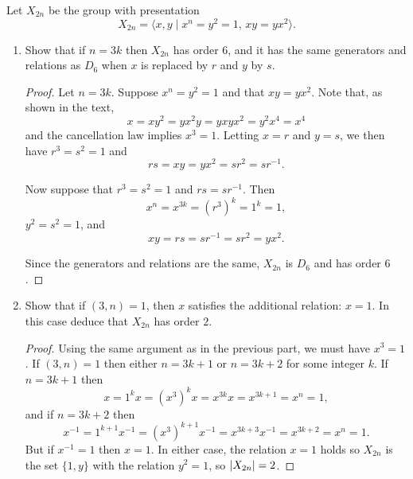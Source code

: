 Let $X_{2n}$ be the group with presentation
\begin{equation*}
  X_{2n} = \langle x, y \mid x^n = y^2 = 1,\,xy = yx^2\rangle.
\end{equation*}
\begin{enumerate}
\item Show that if $n = 3k$ then $X_{2n}$ has order $6$, and it has
  the same generators and relations as $D_6$ when $x$ is replaced by
  $r$ and $y$ by $s$.
  \begin{proof}
    Let $n = 3k$. Suppose $x^n = y^2 = 1$ and that $xy =
    yx^2$. Note that, as shown in the text,
    \begin{equation*}
      x = xy^2 = yx^2y = yxyx^2 = y^2x^4 = x^4
    \end{equation*}
    and the cancellation law implies $x^3 = 1$. Letting $x = r$ and
    $y = s$, we then have $r^3 = s^2 = 1$ and
    \begin{equation*}
      rs = xy = yx^2 = sr^2 = sr^{-1}.
    \end{equation*}

    Now suppose that $r^3 = s^2 = 1$ and $rs = sr^{-1}$. Then
    \begin{equation*}
      x^n = x^{3k} = (r^3)^k = 1^k = 1,
    \end{equation*}
    $y^2 = s^2 = 1$, and
    \begin{equation*}
      xy = rs = sr^{-1} = sr^2 = yx^2.
    \end{equation*}

    Since the generators and relations are the same, $X_{2n}$ is $D_6$
    and has order $6$.
  \end{proof}
\item Show that if $(3,n) = 1$, then $x$ satisfies the additional
  relation: $x = 1$. In this case deduce that $X_{2n}$ has order $2$.
  \begin{proof}
    Using the same argument as in the previous part, we must have
    $x^3 = 1$. If $(3,n) = 1$ then either $n = 3k + 1$ or $n = 3k + 2$
    for some integer $k$. If $n = 3k + 1$ then
    \begin{equation*}
      x = 1^kx = (x^3)^kx = x^{3k}x = x^{3k+1} = x^n = 1,
    \end{equation*}
    and if $n = 3k + 2$ then
    \begin{equation*}
      x^{-1} = 1^{k+1}x^{-1} = (x^3)^{k+1}x^{-1} = x^{3k+3}x^{-1}
      = x^{3k+2} = x^n = 1.
    \end{equation*}
    But if $x^{-1} = 1$ then $x = 1$. In either case, the relation
    $x = 1$ holds so $X_{2n}$ is the set $\{1, y\}$ with the relation
    $y^2 = 1$, so $\lvert{X_{2n}}\rvert = 2$.
  \end{proof}
\end{enumerate}

